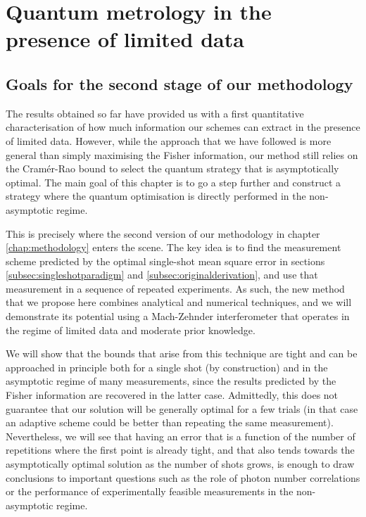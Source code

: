 \chapter{Quantum metrology in the presence of limited data}
\label{chap:limited}

\section{Goals for the second stage of our methodology}

The results obtained so far have provided us with a first quantitative characterisation of how much information our schemes can extract in the presence of limited data. However, while the approach that we have followed is more general than simply maximising the Fisher information, our method still relies on the Cram\'{e}r-Rao bound to select the quantum strategy that is asymptotically optimal. The main goal of this chapter is to go a step further and construct a strategy where the quantum optimisation is directly performed in the non-asymptotic regime. 

This is precisely where the second version of our methodology in chapter \ref{chap:methodology} enters the scene. The key idea is to find the measurement scheme predicted by the optimal single-shot mean square error in sections \ref{subsec:singleshotparadigm} and \ref{subsec:originalderivation}, and use that measurement in a sequence of repeated experiments. As such, the new method that we propose here combines analytical and numerical techniques, and we will demonstrate its potential using a Mach-Zehnder interferometer that operates in the regime of limited data and moderate prior knowledge. 

We will show that the bounds that arise from this technique are tight and can be approached in principle both for a single shot (by construction) and in the asymptotic regime of many measurements, since the results predicted by the Fisher information are recovered in the latter case. Admittedly, this does not guarantee that our solution will be generally optimal for a few trials (in that case an adaptive scheme could be better than repeating the same measurement). Nevertheless, we will see that having an error that is a function of the number of repetitions where the first point is already tight, and that also tends towards the asymptotically optimal solution as the number of shots grows, is enough to draw conclusions to important questions such as the role of photon number correlations or the performance of experimentally feasible measurements in the non-asymptotic regime. 

